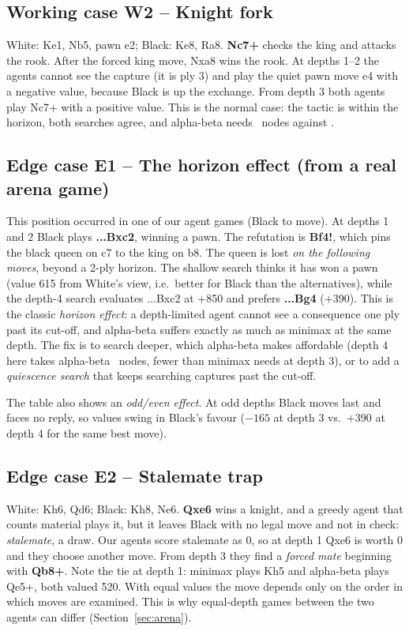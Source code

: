 \documentclass[11pt,a4paper]{article}
\begin{document}
\subsection*{Working case W2 -- Knight fork}
White: Ke1, Nb5, pawn e2; Black: Ke8, Ra8. \textbf{Nc7+} checks the king and attacks the rook. After the forced
king move, Nxa8 wins the rook. At depths 1--2 the agents cannot see the capture (it is ply 3) and play
the quiet pawn move e4 with a negative value, because Black is up the exchange. From depth 3 both agents play Nc7+ with
a positive value. This is the normal case: the tactic is within the horizon, both searches agree, and alpha-beta
needs \WtwoAB\ nodes against \WtwoMM.

\subsection*{Edge case E1 -- The horizon effect (from a real arena game)}
This position occurred in one of our agent games (Black to move). At depths 1 and 2 Black plays
\textbf{...Bxc2}, winning a pawn. The refutation is \textbf{Bf4!}, which pins the black queen on c7 to the
king on b8. The queen is lost \emph{on the following moves}, beyond a 2-ply horizon. The shallow search thinks
it has won a pawn (value 615 from White's view, i.e.\ better for Black than the alternatives), while the depth-4 search
evaluates ...Bxc2 at +850 and prefers \textbf{...Bg4} (+390). This is the classic \emph{horizon effect}: a
depth-limited agent cannot see a consequence one ply past its cut-off, and alpha-beta suffers exactly as much as
minimax at the same depth. The fix is to search deeper, which alpha-beta makes affordable (depth 4 here takes
alpha-beta \EoneABfour\ nodes, fewer than minimax needs at depth 3), or to add a \emph{quiescence search} that keeps
searching captures past the cut-off.

The table also shows an \emph{odd/even effect}. At odd depths Black moves last and faces no reply, so values
swing in Black's favour ($-165$ at depth 3 vs.\ $+390$ at depth 4 for the same best move).

\subsection*{Edge case E2 -- Stalemate trap}
White: Kh6, Qd6; Black: Kh8, Ne6. \textbf{Qxe6} wins a knight, and a greedy agent that counts material plays it,
but it leaves Black with no legal move and not in check: \emph{stalemate}, a draw. Our agents score stalemate as 0, so
at depth 1 Qxe6 is worth 0 and they choose another move. From depth 3 they find a \emph{forced mate}
beginning with \textbf{Qb8+}. Note the tie at depth 1: minimax plays Kh5 and alpha-beta plays Qe5+, both valued 520. With
equal values the move depends only on the order in which moves are examined. This is why equal-depth games between the
two agents can differ (Section~\ref{sec:arena}).
\end{document}
